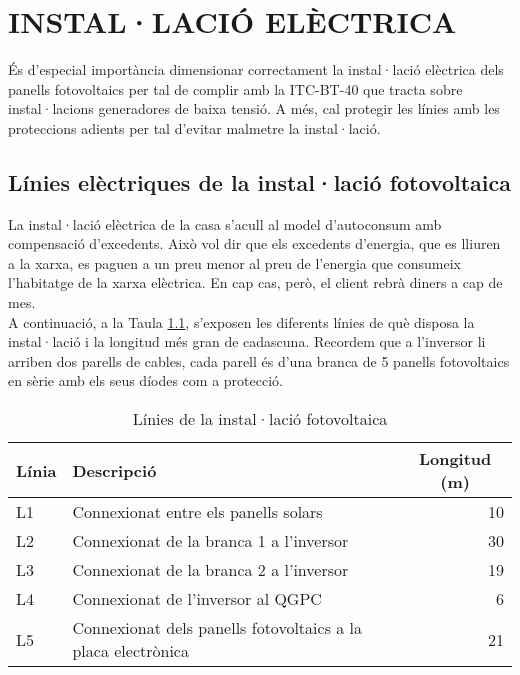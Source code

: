\chapter{\uppercase{Instal·lació elèctrica}}
És d'especial importància dimensionar correctament la instal·lació elèctrica dels panells fotovoltaics per tal de complir amb la ITC-BT-40 que tracta sobre instal·lacions generadores de baixa tensió. A més, cal protegir les línies amb les proteccions adients per tal d'evitar malmetre la instal·lació.

\section{Línies elèctriques de la instal·lació fotovoltaica}
La instal·lació elèctrica de la casa s'acull al model d'autoconsum amb compensació d'excedents. Això vol dir que els excedents d'energia, que es lliuren a la xarxa, es paguen a un preu menor al preu de l'energia que consumeix l'habitatge de la xarxa elèctrica. En cap cas, però, el client rebrà diners a cap de mes.\\
\newline A continuació, a la Taula \ref{tab:linies}, s'exposen les diferents línies de què disposa la instal·lació i la longitud més gran de cadascuna. Recordem que a l'inversor li arriben dos parells de cables, cada parell és d'una branca de 5 panells fotovoltaics en sèrie amb els seus díodes com a protecció.

\begin{table}[H]
\small
  \centering
    \begin{tabular} {|l|l|r|} \hline
  \multicolumn{1}{|l|}{Línia} &  \multicolumn{1}{l|}{Descripció} & \multicolumn{1}{c|}{Longitud (m)} \\ \hline \hline
L1 & Connexionat entre els panells solars & 10 \\ \hline
L2 & Connexionat de la branca 1 a l'inversor & 30 \\ \hline
L3 & Connexionat de la branca 2 a l'inversor & 19 \\ \hline
L4 & Connexionat de l'inversor al QGPC & 6 \\ \hline
L5 & Connexionat dels panells fotovoltaics a la placa electrònica & 21 \\ \hline
	
    \end{tabular}%
  \label{tab:addlabel}%
  \caption{Línies de la instal·lació fotovoltaica}
  \label{tab:linies}
 \end{table}%

